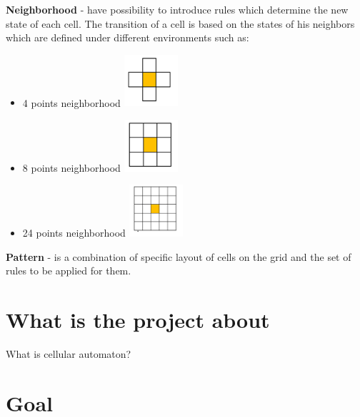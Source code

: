 \documentclass{article}
\begin{document}
\newpage	

\Large {\bf Neighborhood
} 
	-  have possibility to introduce rules which determine the new state of 
	each cell. The transition of a cell is based on the states of his neighbors which are
	defined under different environments such as:
	\begin{itemize}
	
	\item	
		4 points neighborhood \hspace{35pt} 
			 \includegraphics[width=20mm]{images/4_neigh.png} \\

	\item	
		8 points neighborhood \hspace{35pt}
			\includegraphics[width=20mm]{images/8_neigh.png} \\

	\item	
		24 points neighborhood \hspace{35pt}
			\includegraphics[width=20mm]{images/24_neigh.png} \\				
	\end{itemize}

\Large {\bf Pattern
} - is a combination of specific layout of cells on the grid and the set of rules to be applied for them.

\newpage

\section{What is the project about}
What is cellular automaton?
\section{Goal}
\end{document}
